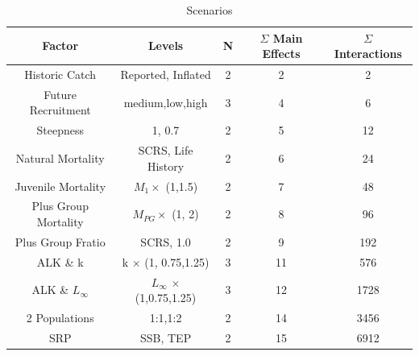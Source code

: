 \documentclass[a4paper, 10pt]{article}
\begin{document}
% 
  
   
\begin{table}
\caption{Scenarios}
\begin{center}
\label{tab:datasumm}
\begin{tabular}{|ccccc|}
\hline
{\tiny Factor}                	& {\tiny Levels} 				& {\tiny N}	& {\tiny $\Sigma$ Main Effects}	& {\tiny $\Sigma$ Interactions}\\				
\hline\hline
{\tiny Historic Catch} 		& {\tiny Reported, Inflated}			& {\tiny 2}	& {\tiny 2}			& {\tiny 2}\\				
{\tiny Future Recruitment}	& {\tiny medium,low,high}			& {\tiny 3}	& {\tiny 4}			& {\tiny 6}\\ 	
{\tiny Steepness}		& {\tiny 1, 0.7}				& {\tiny 2}  	& {\tiny 5}			& {\tiny 12}\\
{\tiny Natural Mortality}	& {\tiny SCRS, Life History}			& {\tiny 2}  	& {\tiny 6}			& {\tiny 24}\\
{\tiny Juvenile Mortality} 	& {\tiny $M_1 \times$ (1,1.5)}   		& {\tiny 2}  	& {\tiny 7}			& {\tiny 48}\\
{\tiny Plus Group Mortality} 	& {\tiny $M_{PG} \times$ (1, 2)}		& {\tiny 2}  	& {\tiny 8}			& {\tiny 96}\\
{\tiny Plus Group Fratio} 	& {\tiny SCRS, 1.0}				& {\tiny 2}  	& {\tiny 9}			& {\tiny 192}\\
\hline\hline
{\tiny ALK \& k} 		& {\tiny k $\times$ (1, 0.75,1.25)}		& {\tiny 3}  	& {\tiny 11}			& {\tiny 576}\\
{\tiny ALK \& $L_{\infty}$} 	& {\tiny  $L_{\infty}$ $\times$ (1,0.75,1.25)}	& {\tiny 3}  	& {\tiny 12}			& {\tiny 1728}\\
{\tiny 2 Populations} 		& {\tiny 1:1,1:2}				& {\tiny 2}  	& {\tiny 14}			& {\tiny 3456}\\
{\tiny SRP} 			& {\tiny SSB, TEP}				& {\tiny 2}	& {\tiny 15}			& {\tiny 6912}\\
\hline
\end{tabular}
\end{center}
\label{tab:scn}
\end{table}
\end{document}
